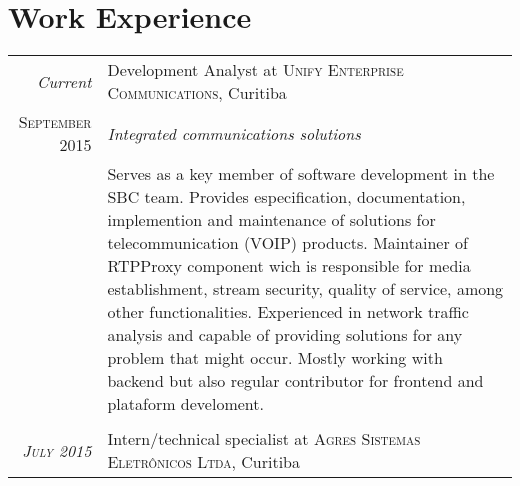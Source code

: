 \documentclass[a4paper,10pt]{article}
\begin{document}
\section{Work Experience}
    \begin{tabular}{r|p{11cm}}
        \emph{Current}               & Development Analyst at \textsc
                                     {Unify Enterprise Communications},
                                     Curitiba \\

        \textsc{September 2015}      &\emph
                                     {Integrated communications solutions} \\
                                     &\footnotesize
                                     {
                                         Serves as a key member of software
                                         development in the SBC team. Provides
                                         especification, documentation,
                                         implemention and maintenance of
                                         solutions for telecommunication (VOIP)
                                         products. Maintainer of RTPProxy
                                         component wich is responsible for media
                                         establishment, stream security, quality
                                         of service, among other functionalities.
                                         Experienced in network traffic analysis
                                         and capable of providing solutions for
                                         any problem that might occur. Mostly
                                         working with backend but also regular
                                         contributor for frontend and plataform
                                         develoment.
                                     } \\
                                     \multicolumn{2}{c}{} \\

        \emph{\textsc{July 2015}}    & Intern/technical specialist at \textsc
                                     {Agres Sistemas Eletrônicos Ltda},
                                     Curitiba \\


\end{tabular}
\end{document}
